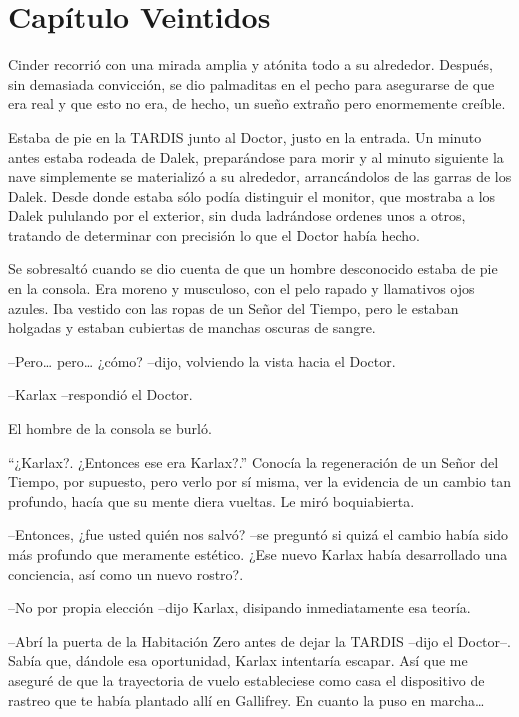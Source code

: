 \chapter*{Capítulo Veintidos}

Cinder recorrió con una mirada amplia y atónita todo a su alrededor. Después, sin demasiada convicción, se dio palmaditas en el pecho para asegurarse de que era real y que esto no era, de hecho, un sueño extraño pero enormemente creíble.

Estaba de pie en la TARDIS junto al Doctor, justo en la entrada. Un minuto antes estaba rodeada de Dalek, preparándose para morir y al minuto siguiente la nave simplemente se materializó a su alrededor, arrancándolos de las garras de los Dalek. Desde donde estaba sólo podía distinguir el  monitor, que mostraba a los Dalek pululando por el exterior, sin duda ladrándose ordenes unos a otros, tratando de determinar con precisión lo que el Doctor había hecho.

Se sobresaltó cuando se dio cuenta de que un hombre desconocido estaba de pie en la consola. Era moreno y musculoso, con el pelo rapado y llamativos ojos azules. Iba vestido con las ropas de un Señor del Tiempo, pero le estaban holgadas y estaban cubiertas de manchas oscuras de sangre.

--Pero… pero… ¿cómo? --dijo, volviendo la vista hacia el Doctor.

--Karlax --respondió el Doctor.

El hombre de la consola se burló.

“¿Karlax?. ¿Entonces ese era Karlax?.” Conocía la regeneración de un Señor del Tiempo, por supuesto, pero verlo por sí misma, ver la evidencia de un cambio tan profundo, hacía que su mente diera vueltas. Le miró boquiabierta. 

--Entonces, ¿fue usted quién nos salvó? --se preguntó si quizá el cambio había sido más profundo que meramente estético. ¿Ese nuevo Karlax había desarrollado una conciencia, así como un nuevo rostro?.

--No por propia elección --dijo Karlax, disipando inmediatamente esa teoría.

--Abrí la puerta de la Habitación Zero antes de dejar la TARDIS --dijo el Doctor--. Sabía que, dándole esa oportunidad, Karlax intentaría escapar. Así que me aseguré de que la trayectoria de vuelo estableciese como casa el dispositivo de rastreo que te había plantado allí en Gallifrey. En cuanto la puso en marcha…

